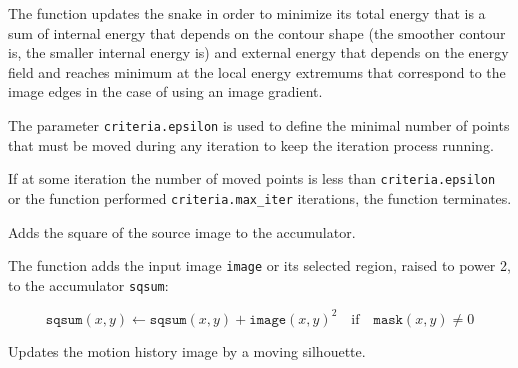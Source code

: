The function updates the snake in order to minimize its
total energy that is a sum of internal energy that depends on the contour
shape (the smoother contour is, the smaller internal energy is) and
external energy that depends on the energy field and reaches minimum at
the local energy extremums that correspond to the image edges in the case
of using an image gradient.

The parameter \texttt{criteria.epsilon} is used to define the minimal
number of points that must be moved during any iteration to keep the
iteration process running.

If at some iteration the number of moved points is less
than \texttt{criteria.epsilon} or the function performed
\texttt{criteria.max\_iter} iterations, the function terminates.

Adds the square of the source image to the accumulator.


\begin{description}
\end{description}

The function adds the input image \texttt{image} or its selected region, raised to power 2, to the accumulator \texttt{sqsum}:

\[ \texttt{sqsum}(x,y) \leftarrow \texttt{sqsum}(x,y) + \texttt{image}(x,y)^2 \quad \text{if} \quad \texttt{mask}(x,y) \ne 0 \]

Updates the motion history image by a moving silhouette.


\begin{description}
\end{description}

